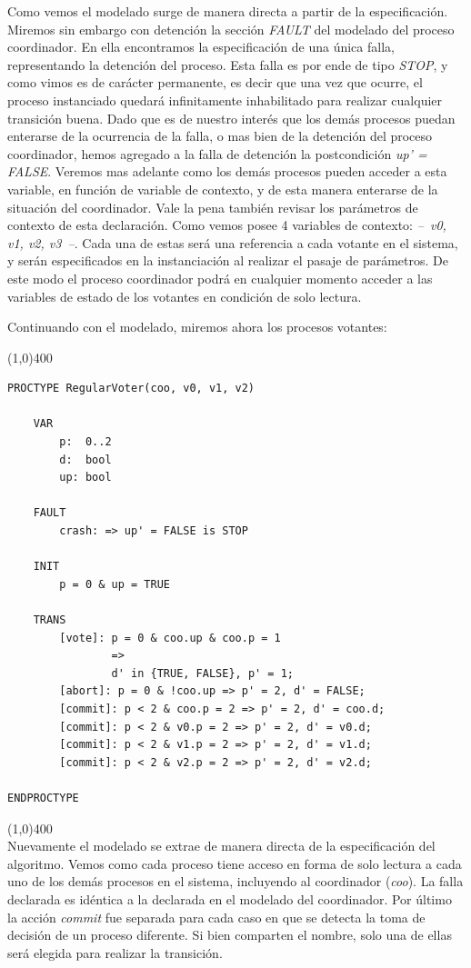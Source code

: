 \documentclass[titlepage, 12pt]{book}
\begin{document}
Como vemos el modelado surge de manera directa a partir de la especificaci\'on. Miremos sin embargo con detenci\'on la secci\'on \textit{FAULT} del modelado del proceso coordinador. En ella encontramos la especificaci\'on de una \'unica falla, representando la detenci\'on del proceso. Esta falla es por ende de tipo \textit{STOP}, y como vimos es de car\'acter permanente, es decir que una vez que ocurre, el proceso instanciado quedar\'a infinitamente inhabilitado para realizar cualquier transici\'on buena. Dado que es de nuestro inter\'es que los dem\'as procesos puedan enterarse de la ocurrencia de la falla, o mas bien de la detenci\'on del proceso coordinador, hemos agregado a la falla de detenci\'on la postcondici\'on \textit{up' = FALSE}. Veremos mas adelante como los dem\'as procesos pueden acceder a esta variable, en funci\'on de variable de contexto, y de esta manera enterarse de la situaci\'on del coordinador. Vale la pena tambi\'en revisar los par\'ametros de contexto de esta declaraci\'on. Como vemos posee 4 variables de contexto: \textit{--~v0, v1, v2, v3~--}. Cada una de estas ser\'a una referencia a cada votante en el sistema, y ser\'an especificados en la instanciaci\'on al realizar el pasaje de par\'ametros. De este modo el proceso coordinador podr\'a en cualquier momento acceder a las variables de estado de los votantes en condici\'on de solo lectura.

Continuando con el modelado, miremos ahora los procesos votantes:

\noindent \line(1,0){400}
\begin{verbatim}
PROCTYPE RegularVoter(coo, v0, v1, v2)
    
    VAR
        p:  0..2
        d:  bool
        up: bool

    FAULT
        crash: => up' = FALSE is STOP
    
    INIT
        p = 0 & up = TRUE

    TRANS
        [vote]: p = 0 & coo.up & coo.p = 1
                => 
                d' in {TRUE, FALSE}, p' = 1;
        [abort]: p = 0 & !coo.up => p' = 2, d' = FALSE;
        [commit]: p < 2 & coo.p = 2 => p' = 2, d' = coo.d;
        [commit]: p < 2 & v0.p = 2 => p' = 2, d' = v0.d;
        [commit]: p < 2 & v1.p = 2 => p' = 2, d' = v1.d;
        [commit]: p < 2 & v2.p = 2 => p' = 2, d' = v2.d;

ENDPROCTYPE
\end{verbatim}
\line(1,0){400}
~\\

Nuevamente el modelado se extrae de manera directa de la especificaci\'on del algoritmo. Vemos como cada proceso tiene acceso en forma de solo lectura a cada uno de los dem\'as procesos en el sistema, incluyendo al coordinador (\textit{coo}). La falla declarada es id\'entica a la declarada en el modelado del coordinador. Por \'ultimo la acci\'on \textit{commit} fue separada para cada caso en que se detecta la toma de decisi\'on de un proceso diferente. Si bien comparten el nombre, solo una de ellas ser\'a elegida para realizar la transici\'on.
\end{document}
